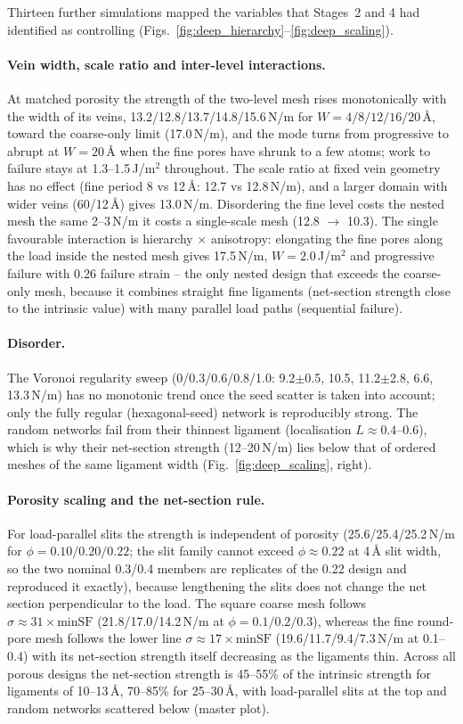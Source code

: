 Thirteen further simulations mapped the variables that Stages~2 and 4 had identified as controlling (Figs.~\ref{fig:deep_hierarchy}--\ref{fig:deep_scaling}).

\paragraph{Vein width, scale ratio and inter-level interactions.} At matched porosity the strength of the two-level mesh rises monotonically with the width of its veins, 13.2/12.8/13.7/14.8/15.6\,N/m for $W=4/8/12/16/20$\,\AA, toward the coarse-only limit (17.0\,N/m), and the mode turns from progressive to abrupt at $W=20$\,\AA{} when the fine pores have shrunk to a few atoms; work to failure stays at 1.3--1.5\,J/m$^2$ throughout. The scale ratio at fixed vein geometry has no effect (fine period 8 vs 12\,\AA: 12.7 vs 12.8\,N/m), and a larger domain with wider veins (60/12\,\AA) gives 13.0\,N/m. Disordering the fine level costs the nested mesh the same 2--3\,N/m it costs a single-scale mesh (12.8 $\to$ 10.3). The single favourable interaction is hierarchy $\times$ anisotropy: elongating the fine pores along the load inside the nested mesh gives 17.5\,N/m, $W=2.0$\,J/m$^2$ and progressive failure with 0.26 failure strain -- the only nested design that exceeds the coarse-only mesh, because it combines straight fine ligaments (net-section strength close to the intrinsic value) with many parallel load paths (sequential failure).

\paragraph{Disorder.} The Voronoi regularity sweep (0/0.3/0.6/0.8/1.0: 9.2$\pm$0.5, 10.5, 11.2$\pm$2.8, 6.6, 13.3\,N/m) has no monotonic trend once the seed scatter is taken into account; only the fully regular (hexagonal-seed) network is reproducibly strong. The random networks fail from their thinnest ligament (localisation $L\approx0.4$--0.6), which is why their net-section strength (12--20\,N/m) lies below that of ordered meshes of the same ligament width (Fig.~\ref{fig:deep_scaling}, right).

\paragraph{Porosity scaling and the net-section rule.} For load-parallel slits the strength is independent of porosity (25.6/25.4/25.2\,N/m for $\phi=0.10/0.20/0.22$; the slit family cannot exceed $\phi\approx0.22$ at 4\,\AA{} slit width, so the two nominal 0.3/0.4 members are replicates of the 0.22 design and reproduced it exactly), because lengthening the slits does not change the net section perpendicular to the load. The square coarse mesh follows $\sigma\approx31\times\mathrm{minSF}$ (21.8/17.0/14.2\,N/m at $\phi=0.1/0.2/0.3$), whereas the fine round-pore mesh follows the lower line $\sigma\approx17\times\mathrm{minSF}$ (19.6/11.7/9.4/7.3\,N/m at 0.1--0.4) with its net-section strength itself decreasing as the ligaments thin. Across all porous designs the net-section strength is 45--55\% of the intrinsic strength for ligaments of 10--13\,\AA, 70--85\% for 25--30\,\AA, with load-parallel slits at the top and random networks scattered below (master plot).
